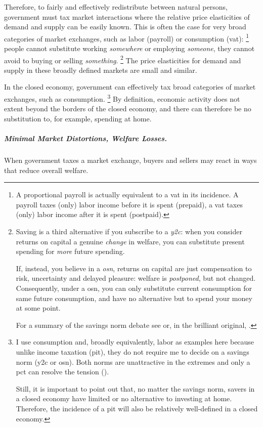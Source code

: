 Therefore, to fairly and effectively redistribute between natural persons, government must tax market interactions where the relative price elasticities of demand and supply can be easily known.
This is often the case for very broad categories of market exchanges, such as labor (\gls{payroll}) or consumption (\gls{vat}):
\footnote{
	A proportional \gls{payroll} is actually equivalent to a \gls{vat} in its incidence.
	A \gls{payroll} taxes (only) labor income before it is spent (prepaid), a \gls{vat} taxes (only) labor income after it is spent (postpaid).
}
people cannot substitute working \emph{somewhere} or employing \emph{someone}, they cannot avoid to buying or selling \emph{something}.
\footnote{
	Saving is a third alternative if you subscribe to a \emph{\gls{y2c}}:
	when you consider returns on capital a genuine \emph{change} in welfare, you can substitute present spending for \emph{more} future spending.

	If, instead, you believe in a \emph{\gls{osn}}, returns on capital are just compensation to risk, uncertainty and delayed pleasure:
	welfare is \emph{postponed}, but not changed.
	Consequently, under a \gls{osn}, you can only substitute current consumption for same future consumption, and have no alternative but to spend your money at some point.

	For a summary of the savings norm debate see \cite{Held2010a} or, in the brilliant original, \cite[819]{McCaffery2005}.
}
The price elasticities for demand and supply in these broadly defined markets are small and similar.

In the closed economy, government can effectively tax broad categories of market exchanges, such as consumption.
\footnote{
	I use consumption and, broadly equivalently, labor as examples here because unlike income taxation (\gls{pit}), they do not require me to decide on a savings norm (\gls{y2c} or \gls{osn}).
	Both norms are unattractive in the extremes and only a \gls{pct} can resolve the tension (\citealt{Held2010a}).

	Still, it is important to point out that, no matter the savings norm, savers in a closed economy have limited or no alternative to investing at home.
	Therefore, the incidence of a \gls{pit} will also be relatively well-defined in a closed economy.
}
By definition, economic activity does not extent beyond the borders of the closed economy, and there can therefore be no substitution to, for example, spending at home.

\subparagraph[Tax Efficiency]{Minimal Market Distortions, Welfare Losses.}
	\label{sec:minimal-DWL}
When government taxes a market exchange, buyers and sellers may react in ways that reduce overall welfare.


